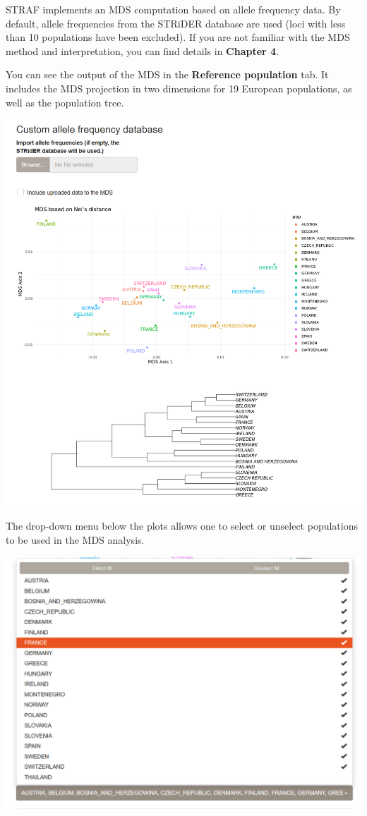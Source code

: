 \documentclass[
]{book}
\begin{document}
STRAF implements an MDS computation based on allele frequency data. By default,
allele frequencies from the STRiDER database are used (loci with less than 10
populations have been excluded). If you are not familiar with the MDS method and
interpretation, you can find details in \textbf{Chapter 4}.

You can see the output of the MDS in the \textbf{Reference population} tab. It includes the
MDS projection in two dimensions for 19 European populations, as well as the population
tree.

\includegraphics[width=0.8\linewidth]{img/capture_ref_pop_1}

The drop-down menu below the plots allows one to select or unselect populations
to be used in the MDS analysis.

\includegraphics[width=0.8\linewidth]{img/capture_ref_pop_2}
\end{document}
